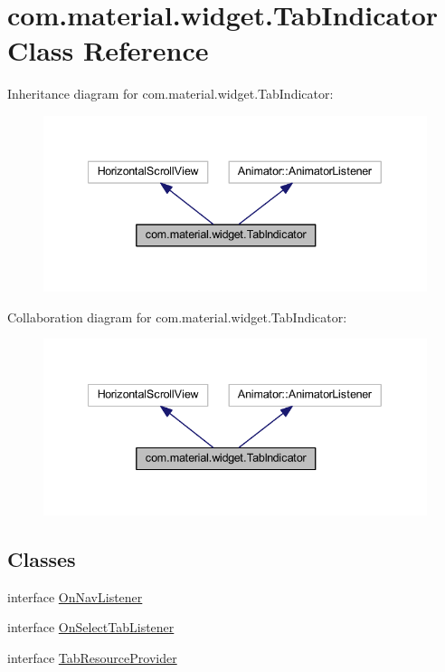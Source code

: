 \hypertarget{classcom_1_1material_1_1widget_1_1_tab_indicator}{}\section{com.\+material.\+widget.\+Tab\+Indicator Class Reference}
\label{classcom_1_1material_1_1widget_1_1_tab_indicator}


Inheritance diagram for com.\+material.\+widget.\+Tab\+Indicator\+:
\nopagebreak
\begin{figure}[H]
\begin{center}
\leavevmode
\includegraphics[width=340pt]{classcom_1_1material_1_1widget_1_1_tab_indicator__inherit__graph}
\end{center}
\end{figure}


Collaboration diagram for com.\+material.\+widget.\+Tab\+Indicator\+:
\nopagebreak
\begin{figure}[H]
\begin{center}
\leavevmode
\includegraphics[width=340pt]{classcom_1_1material_1_1widget_1_1_tab_indicator__coll__graph}
\end{center}
\end{figure}
\subsection*{Classes}
\begin{DoxyCompactItemize}
\item 
interface \hyperlink{interfacecom_1_1material_1_1widget_1_1_tab_indicator_1_1_on_nav_listener}{On\+Nav\+Listener}
\item 
interface \hyperlink{interfacecom_1_1material_1_1widget_1_1_tab_indicator_1_1_on_select_tab_listener}{On\+Select\+Tab\+Listener}
\item 
interface \hyperlink{interfacecom_1_1material_1_1widget_1_1_tab_indicator_1_1_tab_resource_provider}{Tab\+Resource\+Provider}
\end{DoxyCompactItemize}
